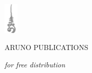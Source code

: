 \documentclass[11pt,oneside,final,showtrims]{memoir}
\begin{document}
\centering

\mbox{}\vfill

\includegraphics[height=15mm,keepaspectratio]{buddho.jpg}
\vspace*{3mm}

ARUNO PUBLICATIONS
\vspace*{4mm}

\emph{for free distribution}
\vspace*{9mm}
\end{document}
